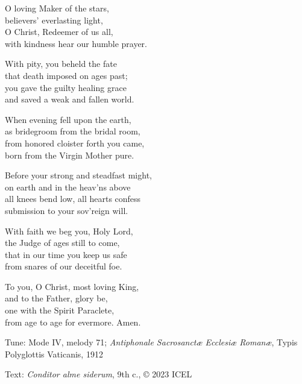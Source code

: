 \hymn

\settowidth{\versewidth}{Before your strong and steadfast might,}

\begin{hymnverse}[\versewidth]
O loving Maker of the stars,\\
believers’ everlasting light,\\
O Christ, Redeemer of us all,\\
with kindness hear our humble prayer.

With pity, you beheld the fate\\
that death imposed on ages past;\\
you gave the guilty healing grace\\
and saved a weak and fallen world.

When evening fell upon the earth,\\
as bridegroom from the bridal room,\\
from honored cloister forth you came,\\
born from the Virgin Mother pure.

Before your strong and steadfast might,\\
on earth and in the heav’ns above\\
all knees bend low, all hearts confess\\
submission to your sov’reign will.

With faith we beg you, Holy Lord,\\
the Judge of ages still to come,\\
that in our time you keep us safe\\
from snares of our deceitful foe.

To you, O Christ, most loving King,\\
and to the Father, glory be,\\
one with the Spirit Paraclete,\\
from age to age for evermore. Amen.
\end{hymnverse}

\begin{hymnsource}
Tune: Mode IV, melody 71; \emph{Antiphonale Sacrosanctæ Ecclesiæ Romanæ}, Typis Polyglottis Vaticanis, 1912

Text: \emph{Conditor alme siderum}, 9th c., © 2023 ICEL

\end{hymnsource}